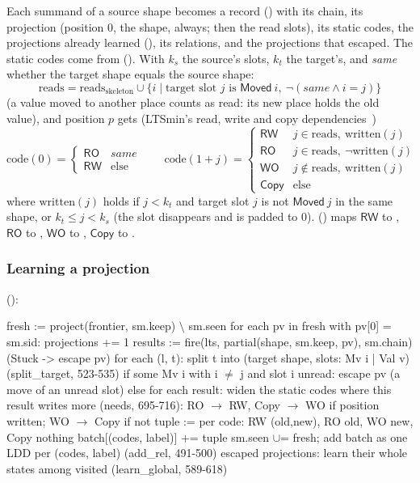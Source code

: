 Each summand of a source shape becomes a record
() with its chain, its projection
 (position 0, the shape, always; then the read slots), its
static codes, the projections already learned (), its
relations, and the projections that escaped. The static codes come from
 (). With $k_s$ the
source's slots, $k_t$ the target's, and \emph{same} whether the target
shape equals the source shape:
\[
\mathrm{reads} = \mathrm{reads}_{\mathrm{skeleton}} \cup \{ i \mid
  \text{target slot } j \text{ is } \mathsf{Moved}\ i,\ \neg(\mathit{same}
  \wedge i = j) \}
\]
(a value moved to another place counts as read: its new place holds the
old value), and position $p$ gets (LTSmin's read, write and copy
dependencies~\cite{meijer14})
\[
\mathrm{code}(0) = \begin{cases}\mathsf{RO} & \mathit{same}\\
\mathsf{RW} & \text{else}\end{cases}
\qquad
\mathrm{code}(1+j) = \begin{cases}
\mathsf{RW} & j\in\mathrm{reads},\ \mathrm{written}(j)\\
\mathsf{RO} & j\in\mathrm{reads},\ \neg\mathrm{written}(j)\\
\mathsf{WO} & j\notin\mathrm{reads},\ \mathrm{written}(j)\\
\mathsf{Copy} & \text{else}
\end{cases}
\]
where $\mathrm{written}(j)$ holds if $j<k_t$ and target slot $j$ is not
$\mathsf{Moved}\ j$ in the same shape, or $k_t \le j < k_s$ (the slot
disappears and is padded to 0). 
() maps $\mathsf{RW}$ to
, $\mathsf{RO}$ to , $\mathsf{WO}$ to
, $\mathsf{Copy}$ to .

\subsubsection{Learning a projection}

 ():

\begin{shell}[mathescape=true]
fresh := project(frontier, sm.keep) $\setminus$ sm.seen
for each pv in fresh with pv[0] = sm.sid:                   projections += 1
  results := fire(lts, partial(shape, sm.keep, pv), sm.chain)    (Stuck -> escape pv)
  for each (l, t): split t into (target shape, slots: Mv i | Val v)    (split_target, 523-535)
  if some Mv i with i $\ne$ j and slot i unread: escape pv     (a move of an unread slot)
  else for each result:
    widen the static codes where this result writes more        (needs, 695-716):
      RO $\to$ RW, Copy $\to$ WO   if position written;  WO $\to$ Copy  if not
    tuple := per code: RW (old,new), RO old, WO new, Copy nothing
    batch[(codes, label)] += tuple
sm.seen $\cup$= fresh;  add batch as one LDD per (codes, label)       (add_rel, 491-500)
escaped projections: learn their whole states among visited  (learn_global, 589-618)
\end{shell}

